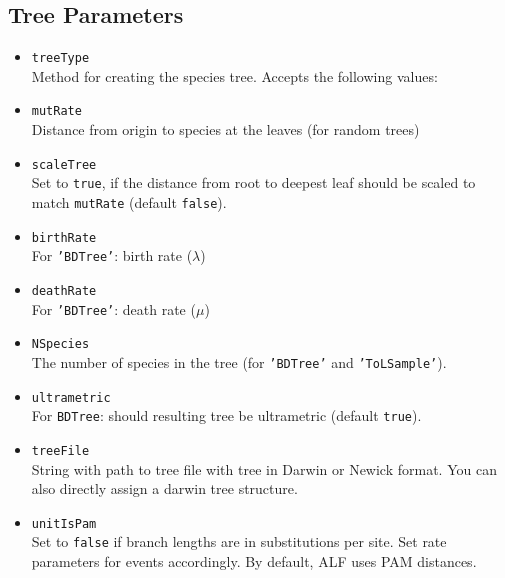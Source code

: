\documentclass[11pt]{article}
\begin{document}
\subsection{Tree Parameters}
\begin{itemize}
\item{\texttt{treeType}} \hfill \\
Method for creating the species tree. Accepts the following values:
\item{\texttt{mutRate}} \hfill \\
Distance from origin to species at the leaves (for random trees)
\item{\texttt{scaleTree}} \hfill \\
Set to \texttt{true}, if the distance from root to deepest leaf should be scaled to match \texttt{mutRate} (default \texttt{false}).
\item{\texttt{birthRate}} \hfill \\
For \texttt{'BDTree'}: birth rate ($\lambda$)
\item{\texttt{deathRate}} \hfill \\
For \texttt{'BDTree'}: death rate ($\mu$)
\item{\texttt{NSpecies}} \hfill \\
The number of species in the tree (for \texttt{'BDTree'} and \texttt{'ToLSample'}).
\item{\texttt{ultrametric}} \hfill \\
For \texttt{BDTree}: should resulting tree be ultrametric (default \texttt{true}).
\item{\texttt{treeFile}} \hfill \\
String with path to tree file with tree in Darwin or Newick format. You can also directly assign a darwin tree structure.
\item{\texttt{unitIsPam}} \hfill \\
Set to \texttt{false} if branch lengths are in substitutions per site. Set rate parameters for events accordingly. By default, ALF uses PAM distances.
\end{itemize}
\end{document}
